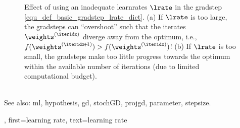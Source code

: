 {{\begin{figure}[hbtp]
\begin{center}
\begin{minipage}{0.45\columnwidth}
			\end{minipage}
		\end{center}
		\caption{Effect of using an inadequate \glspl{learnrate} $\lrate$ in the \gls{gradstep} 
		         \eqref{equ_def_basic_gradstep_lrate_dict}. (a) If $\lrate$ is too large, 
				 the \glspl{gradstep} can ``overshoot'' such that the iterates $\weights^{(\iteridx)}$ 
				 diverge away from the optimum, i.e., $f(\weights^{(\iteridx\!+\!1)}) > f(\weights^{(\iteridx)})$! 
		(b) If $\lrate$ is too small, the \glspl{gradstep} make too little progress towards 
		the optimum within the available number of iterations (due to limited computational budget). 
		\label{fig_small_large_lrate_dict}}
		\end{figure}
				\\
		See also: \gls{ml}, \gls{hypothesis}, \gls{gd}, \gls{stochGD}, \gls{projgd}, \gls{parameter}, \gls{stepsize}.},
	first={learning rate},
	text={learning rate} 
}

